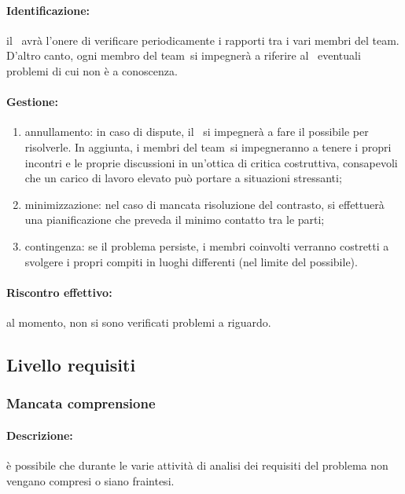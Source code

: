 \documentclass[../PianoProgetto.tex]{subfiles}
\begin{document}
	\paragraph*{Identificazione:} il \responsabilediprogetto\ avrà l'onere di verificare periodicamente i rapporti tra i vari membri del team\g. D'altro canto, ogni membro del team\g\ si impegnerà a riferire al \responsabilediprogetto\ eventuali problemi di cui non è a conoscenza.
	
	\paragraph*{Gestione:}
	\begin{enumerate}
		\item annullamento: in caso di dispute, il \responsabilediprogetto\ si impegnerà a fare il possibile per risolverle. In aggiunta, i membri del team\g\ si impegneranno a tenere i propri incontri e le proprie discussioni in un'ottica di critica costruttiva, consapevoli che un carico di lavoro elevato può portare a situazioni stressanti;
		\item minimizzazione: nel caso di mancata risoluzione del contrasto, si effettuerà una pianificazione che preveda il minimo contatto tra le parti; 
		\item contingenza: se il problema persiste, i membri coinvolti verranno costretti a svolgere i propri compiti in luoghi differenti (nel limite del possibile).
	\end{enumerate}	
	
	\paragraph*{Riscontro effettivo:} al momento, non si sono verificati problemi a riguardo.


\subsection{Livello requisiti}

\subsubsection{Mancata comprensione}

	\paragraph*{Descrizione:} è possibile che durante le varie attività di analisi dei requisiti del problema non vengano compresi o siano fraintesi.
	
\end{document}
